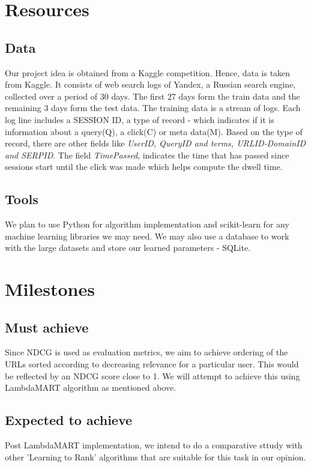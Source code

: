 \documentclass[11pt]{article}
\begin{document}
\section{Resources}
\subsection{Data}
Our project idea is obtained from a Kaggle competition. Hence, data is taken from Kaggle. It consists of web search logs of Yandex, a Russian search engine, collected over a period of 30 days. The first 27 days form the train data and the remaining 3 days form the test data. \newline
The training data is a stream of logs. Each log line includes a SESSION ID, a type of record  - which indicates if it is information about a query(Q), a click(C) or meta data(M). Based on the type of record, there are other fields like \textsl{UserID, QueryID and terms, URLID-DomainID and SERPID}. The field \textsl{TimePassed}, indicates the time that has passed since sessions start until the click was made which helps compute the dwell time.

\subsection{Tools}
We plan to use Python for algorithm implementation and scikit-learn for any machine learning libraries we may need. We may also use a database to work with the large datasets and store our learned parameters - SQLite.

\section{Milestones}
\subsection{Must achieve}
Since NDCG is used as evaluation metrics, we aim to achieve ordering of the URLs sorted according to decreasing relevance for a particular user. This would be reflected by an NDCG score close to 1. We will attempt to achieve this using LambdaMART algorithm as mentioned above.   
\subsection{Expected to achieve}
Post LambdaMART implementation, we intend to do a comparative sttudy with other 'Learning to Rank' algorithms that are suitable for this task in our opinion. 
\end{document}
